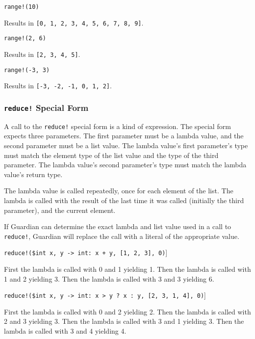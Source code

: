 {{		\begin{itemize}
		{
			\item[] \texttt{range!(10)}
			
				Results in \texttt{[0, 1, 2, 3, 4, 5, 6, 7, 8, 9]}.
			
			\item[] \texttt{range!(2, 6)}
			
				Results in \texttt{[2, 3, 4, 5]}.
				
			\item[] \texttt{range!(-3, 3)}
			
				Results in \texttt{[-3, -2, -1, 0, 1, 2]}.
		}
		\end{itemize}
	}
	
	\subsubsection{\texttt{reduce!} Special Form}
	{
		A call to the \texttt{reduce!} special form is a kind of expression.
		The special form expects three parameters.
		The first parameter must be a lambda value, and the
		second parameter must be a list value.
		The lambda value's first parameter's type
		must match the element type of the list value and the type of the third
		parameter. The lambda value's
		second parameter's type must match the lambda value's return type.
		
		The lambda value is called repeatedly, once for each element of the list.
		The lambda is called with the result of the last time it was
		called (initially the third parameter), and
		the current element.
		
		If Guardian can determine the exact lambda and list value used in a call to
		\texttt{reduce!}, Guardian will replace the call with a literal of
		the appropriate value.
		
		\begin{itemize}
		{
			\item[] \texttt{reduce!(\$int x, y -> int: x + y, [1, 2, 3], 0)}]
			
				First the lambda is called with 0 and 1 yielding 1.
				Then the lambda is called with 1 and 2 yielding 3.
				Then the lambda is called with 3 and 3 yielding 6.
			
			\item[] \texttt{reduce!(\$int x, y -> int: x > y ? x : y, [2, 3, 1, 4], 0)}]
			
				First the lambda is called with 0 and 2 yielding 2.
				Then the lambda is called with 2 and 3 yielding 3.
				Then the lambda is called with 3 and 1 yielding 3.
				Then the lambda is called with 3 and 4 yielding 4.
			
}
\end{itemize}}}
